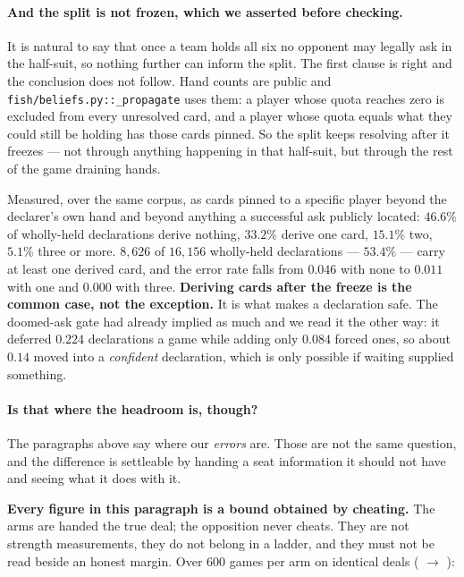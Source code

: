 \documentclass[11pt,a4paper]{article}
\begin{document}
\paragraph{And the split is not frozen, which we asserted before checking.}
It is natural to say that once a team holds all six no opponent may legally ask
in the half-suit, so nothing further can inform the split. The first clause is
right and the conclusion does not follow. Hand counts are public and
\texttt{fish/beliefs.py::\_propagate} uses them: a player whose quota reaches
zero is excluded from every unresolved card, and a player whose quota equals
what they could still be holding has those cards pinned. So the split keeps
resolving after it freezes --- not through anything happening in that half-suit,
but through the rest of the game draining hands.

Measured, over the same corpus, as cards pinned to a specific player beyond the
declarer's own hand and beyond anything a successful ask publicly located:
$46.6\%$ of wholly-held declarations derive nothing, $33.2\%$ derive one card,
$15.1\%$ two, $5.1\%$ three or more. $8{,}626$ of $16{,}156$ wholly-held declarations --- $53.4\%$ --- carry at
least one derived card, and the error rate falls from $0.046$ with none to
$0.011$ with one and $0.000$ with three. \textbf{Deriving cards after the
freeze is the common case, not the exception.} It is what makes a declaration safe.
The doomed-ask gate had already implied as much and we read it the other way:
it deferred $0.224$ declarations a game while adding only $0.084$ forced ones,
so about $0.14$ moved into a \emph{confident} declaration, which is only
possible if waiting supplied something.

\paragraph{Is that where the headroom is, though?} The paragraphs above say
where our \emph{errors} are. Those are not the same question, and the
difference is settleable by handing a seat information it should not have and
seeing what it does with it.

\textbf{Every figure in this paragraph is a bound obtained by cheating.} The
arms are  handed the true deal; the opposition never
cheats. They are not strength measurements, they do not belong in a ladder, and
they must not be read beside an honest margin. Over $600$ games per arm on
identical deals ( $\rightarrow$
):
\end{document}

